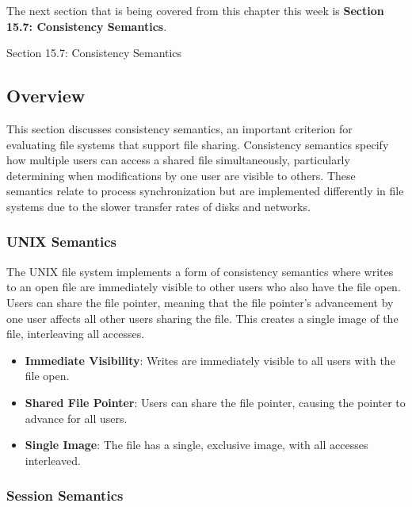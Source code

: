 The next section that is being covered from this chapter this week is \textbf{Section 15.7: Consistency Semantics}.

\begin{notes}{Section 15.7: Consistency Semantics}
    \subsection*{Overview}

    This section discusses consistency semantics, an important criterion for evaluating file systems that support file sharing. Consistency semantics specify how multiple users can access a shared 
    file simultaneously, particularly determining when modifications by one user are visible to others. These semantics relate to process synchronization but are implemented differently in file systems 
    due to the slower transfer rates of disks and networks.
    
    \subsubsection*{UNIX Semantics}
    
    The UNIX file system implements a form of consistency semantics where writes to an open file are immediately visible to other users who also have the file open. Users can share the file pointer, 
    meaning that the file pointer's advancement by one user affects all other users sharing the file. This creates a single image of the file, interleaving all accesses.
    
    \begin{highlight}
    
        \begin{itemize}
            \item \textbf{Immediate Visibility}: Writes are immediately visible to all users with the file open.
            \item \textbf{Shared File Pointer}: Users can share the file pointer, causing the pointer to advance for all users.
            \item \textbf{Single Image}: The file has a single, exclusive image, with all accesses interleaved.
        \end{itemize}
    
    \end{highlight}
    
    \subsubsection*{Session Semantics}
    

\end{notes}
